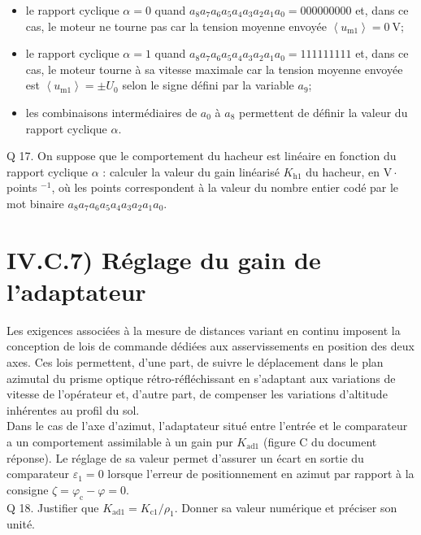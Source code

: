 \documentclass[10pt]{article}
\begin{document}
\begin{itemize}
  \item le rapport cyclique $\alpha=0$ quand $a_{8} a_{7} a_{6} a_{5} a_{4} a_{3} a_{2} a_{1} a_{0}=000000000$ et, dans ce cas, le moteur ne tourne pas car la tension moyenne envoyée $\left\langle u_{\mathrm{m} 1}\right\rangle=0 \mathrm{~V}$;
  \item le rapport cyclique $\alpha=1$ quand $a_{8} a_{7} a_{6} a_{5} a_{4} a_{3} a_{2} a_{1} a_{0}=111111111$ et, dans ce cas, le moteur tourne à sa vitesse maximale car la tension moyenne envoyée est $\left\langle u_{\mathrm{m} 1}\right\rangle= \pm U_{0}$ selon le signe défini par la variable $a_{9}$;
  \item les combinaisons intermédiaires de $a_{0}$ à $a_{8}$ permettent de définir la valeur du rapport cyclique $\alpha$.
\end{itemize}

Q 17. On suppose que le comportement du hacheur est linéaire en fonction du rapport cyclique $\alpha$ : calculer la valeur du gain linéarisé $K_{\mathrm{h} 1}$ du hacheur, en $\mathrm{V} \cdot$ points ${ }^{-1}$, où les points correspondent à la valeur du nombre entier codé par le mot binaire $a_{8} a_{7} a_{6} a_{5} a_{4} a_{3} a_{2} a_{1} a_{0}$.

\section*{IV.C.7) Réglage du gain de l'adaptateur}
Les exigences associées à la mesure de distances variant en continu imposent la conception de lois de commande dédiées aux asservissements en position des deux axes. Ces lois permettent, d'une part, de suivre le déplacement dans le plan azimutal du prisme optique rétro-réfléchissant en s'adaptant aux variations de vitesse de l'opérateur et, d'autre part, de compenser les variations d'altitude inhérentes au profil du sol.\\
Dans le cas de l'axe d'azimut, l'adaptateur situé entre l'entrée et le comparateur a un comportement assimilable à un gain pur $K_{\mathrm{ad} 1}$ (figure C du document réponse). Le réglage de sa valeur permet d'assurer un écart en sortie du comparateur $\varepsilon_{1}=0$ lorsque l'erreur de positionnement en azimut par rapport à la consigne $\zeta=\varphi_{\mathrm{c}}-\varphi=0$.\\
Q 18. Justifier que $K_{\mathrm{ad} 1}=K_{\mathrm{c} 1} / \rho_{1}$. Donner sa valeur numérique et préciser son unité.
\end{document}
